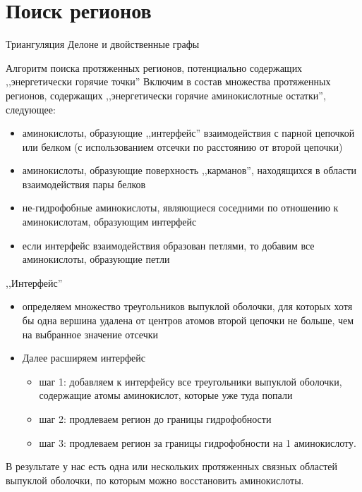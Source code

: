 \documentclass[12pt, xcolor={dvipsnames}]{beamer}
\begin{document}
\section{Поиск регионов}
\begin{frame}{Триангуляция Делоне и двойственные графы}
\end{frame}
\begin{frame}{Алгоритм поиска протяженных регионов,}{ потенциально содержащих ,,энергетически горячие точки''}
Включим в состав множества протяженных регионов, содержащих ,,энергетически горячие аминокислотные остатки'', следующее:
\begin{itemize}
\item аминокислоты, образующие ,,интерфейс'' взаимодействия с парной цепочкой или белком (с использованием отсечки по расстоянию от второй цепочки)
\item аминокислоты, образующие поверхность ,,карманов'', находящихся в области взаимодействия пары белков
\item не-гидрофобные аминокислоты, являющиеся соседними по отношению к аминокислотам, образующим интерфейс
\item если интерфейс взаимодействия образован петлями, то добавим все аминокислоты, образующие петли 
\end{itemize}


\end{frame}
\begin{frame}{,,Интерфейс''}
\begin{itemize}
\item определяем множество треугольников выпуклой оболочки, для которых хотя бы одна вершина удалена от центров атомов второй цепочки не больше, чем на выбранное значение отсечки
\item Далее расширяем интерфейс
\begin{itemize}
\item шаг 1: добавляем к интерфейсу все треугольники выпуклой оболочки, содержащие атомы аминокислот, которые уже туда попали
\item шаг 2: продлеваем регион до границы гидрофобности
\item шаг 3: продлеваем регион за границы гидрофобности на 1 аминокислоту.
\end{itemize}
\end{itemize}

В результате у нас есть одна или нескольких протяженных связных областей выпуклой оболочки, по которым можно восстановить аминокислоты.
\end{frame}
\end{document}
